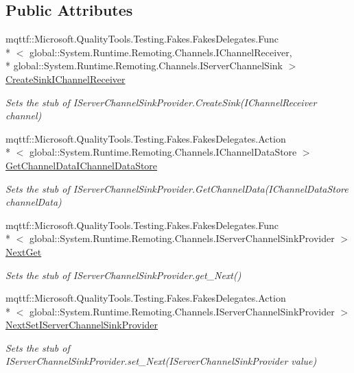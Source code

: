 \subsection*{Public Attributes}
\begin{DoxyCompactItemize}
\item 
mqttf\-::\-Microsoft.\-Quality\-Tools.\-Testing.\-Fakes.\-Fakes\-Delegates.\-Func\\*
$<$ global\-::\-System.\-Runtime.\-Remoting.\-Channels.\-I\-Channel\-Receiver, \\*
global\-::\-System.\-Runtime.\-Remoting.\-Channels.\-I\-Server\-Channel\-Sink $>$ \hyperlink{class_system_1_1_runtime_1_1_remoting_1_1_channels_1_1_fakes_1_1_stub_i_server_channel_sink_provider_a4e5956ec597ee075886e186c5dbb8c45}{Create\-Sink\-I\-Channel\-Receiver}
\begin{DoxyCompactList}\small\item\em Sets the stub of I\-Server\-Channel\-Sink\-Provider.\-Create\-Sink(\-I\-Channel\-Receiver channel)\end{DoxyCompactList}\item 
mqttf\-::\-Microsoft.\-Quality\-Tools.\-Testing.\-Fakes.\-Fakes\-Delegates.\-Action\\*
$<$ global\-::\-System.\-Runtime.\-Remoting.\-Channels.\-I\-Channel\-Data\-Store $>$ \hyperlink{class_system_1_1_runtime_1_1_remoting_1_1_channels_1_1_fakes_1_1_stub_i_server_channel_sink_provider_a2dc66dcc5e2067b5bee4c6b70a03720e}{Get\-Channel\-Data\-I\-Channel\-Data\-Store}
\begin{DoxyCompactList}\small\item\em Sets the stub of I\-Server\-Channel\-Sink\-Provider.\-Get\-Channel\-Data(\-I\-Channel\-Data\-Store channel\-Data)\end{DoxyCompactList}\item 
mqttf\-::\-Microsoft.\-Quality\-Tools.\-Testing.\-Fakes.\-Fakes\-Delegates.\-Func\\*
$<$ global\-::\-System.\-Runtime.\-Remoting.\-Channels.\-I\-Server\-Channel\-Sink\-Provider $>$ \hyperlink{class_system_1_1_runtime_1_1_remoting_1_1_channels_1_1_fakes_1_1_stub_i_server_channel_sink_provider_ab1b5641e04b4fb02d5601dee4f0fcde2}{Next\-Get}
\begin{DoxyCompactList}\small\item\em Sets the stub of I\-Server\-Channel\-Sink\-Provider.\-get\-\_\-\-Next()\end{DoxyCompactList}\item 
mqttf\-::\-Microsoft.\-Quality\-Tools.\-Testing.\-Fakes.\-Fakes\-Delegates.\-Action\\*
$<$ global\-::\-System.\-Runtime.\-Remoting.\-Channels.\-I\-Server\-Channel\-Sink\-Provider $>$ \hyperlink{class_system_1_1_runtime_1_1_remoting_1_1_channels_1_1_fakes_1_1_stub_i_server_channel_sink_provider_a7aca1f3dfda99d134bac38c2aa6ada5c}{Next\-Set\-I\-Server\-Channel\-Sink\-Provider}
\begin{DoxyCompactList}\small\item\em Sets the stub of I\-Server\-Channel\-Sink\-Provider.\-set\-\_\-\-Next(\-I\-Server\-Channel\-Sink\-Provider value)\end{DoxyCompactList}\end{DoxyCompactItemize}


